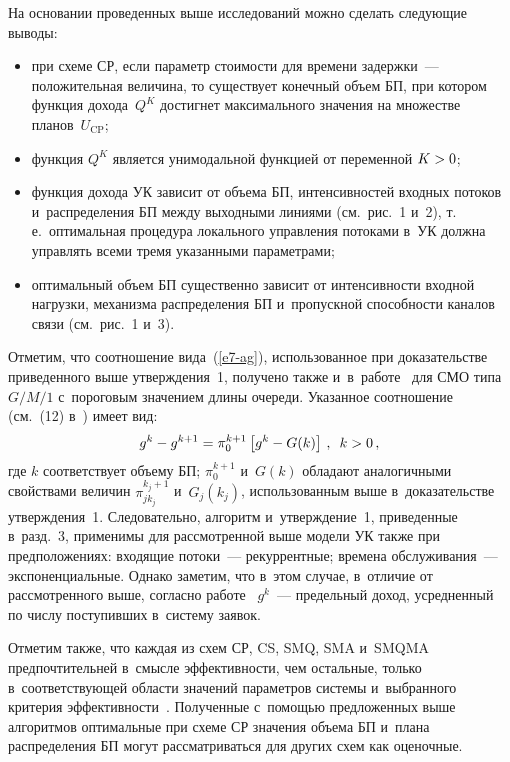 \begin{multicols}{2}
  На основании проведенных выше исследований можно сделать следующие 
выводы:
  \begin{itemize}
\item при схеме СР, если параметр стоимости для времени задержки~--- 
положительная величина, то существует конечный объем БП, при котором 
функция дохода~$Q^K$ достигнет максимального значения на множестве 
планов~$U_{\mathrm{CP}}$; 
\item функция $Q^K$ является унимодальной функцией от переменной 
$K\hm>0$;
\item функция дохода УК зависит от объема БП, интенсивностей входных 
потоков и~распределения БП между выходными линиями (см.\ рис.~1 и~2), 
т.\,е.\ оптимальная процедура локального управления потоками в~УК должна 
управлять всеми тремя указанными параметрами; 
\item оптимальный объем БП существенно зависит от 
интенсивности входной нагрузки, механизма распределения БП 
и~пропускной спо\-соб\-ности каналов связи (см.\ рис.~1 и~3).
\end{itemize}

  Отметим, что соотношение вида~(\ref{e7-ag}), использованное при 
доказательстве приведенного выше утверждения~1, получено также 
и~в~работе~\cite{13-ag} для СМО типа $G/M/1$ с~пороговым значением длины 
очереди. Указанное соотношение (см.~(12) в~\cite{13-ag}) имеет вид:
  $$
  g^k-g^{k+1} =\pi_0^{k+1}\left[ g^k -G(k)\right]\,,\enskip k>0\,,
  $$
где $k$ соответствует объему БП; $\pi_0^{k+1}$ и~$G(k)$ обладают 
аналогичными свойствами величин $\pi_{jk_j}^{k_j+1}$ и~$G_j(k_j)$, 
использованным выше в~доказательстве утверждения~1. Следовательно, 
алгоритм и~утверж\-де\-ние~1, приведенные в~разд.~3, применимы для 
рассмотренной выше модели УК также при предположениях: входящие 
потоки~--- рекуррентные; времена обслуживания~--- экспоненциальные. 
Однако заметим, что в~этом случае, в~отличие от рас\-смот\-рен\-но\-го выше, 
согласно работе~\cite{13-ag} $g^k$~--- предельный доход, усредненный по 
числу поступивших в~систему заявок.

  Отметим также, что каждая из схем СР, CS, SMQ, SMA и~SMQMA 
предпочтительней в~смысле эффективности, чем остальные, только 
в~соответствующей области значений параметров системы и~выбранного 
критерия эффективности~\cite{5-ag}. Полученные с~помощью предложенных 
выше алгоритмов оптимальные при схеме СР значения объема БП и~плана 
распределения БП могут рассматриваться для других схем как оценочные. 


\end{multicols}
